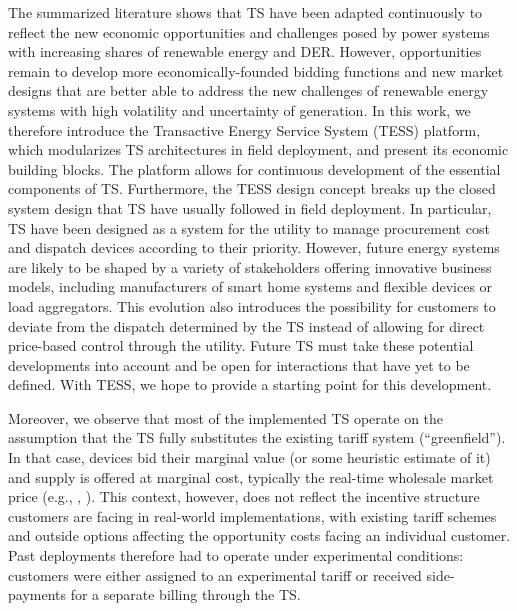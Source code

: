 The summarized literature shows that TS have been adapted continuously to reflect the new economic opportunities and challenges posed by power systems with increasing shares of renewable energy and DER.
However, opportunities remain to develop more economically-founded bidding functions and new market designs that are better able to address the new challenges of renewable energy systems with high volatility and uncertainty of generation.
In this work, we therefore introduce the Transactive Energy Service System (TESS) platform, which modularizes TS architectures in field deployment, and present its economic building blocks. 
The platform allows for continuous development of the essential components of TS.
Furthermore, the TESS design concept breaks up the closed system design that TS have usually followed in field deployment. In particular, TS have been designed as a system for the utility to manage procurement cost and dispatch devices according to their priority. However, future energy systems are likely to be shaped by a variety of stakeholders offering innovative business models, including manufacturers of smart home systems and flexible devices or load aggregators. This evolution also introduces the possibility for customers to deviate from the dispatch determined by the TS instead of allowing for direct price-based control through the utility. 
Future TS must take these potential developments into account and be open for interactions that have yet to be defined. With TESS, we hope to provide a starting point for this development.

Moreover, we observe that most of the implemented TS operate on the assumption that the TS fully substitutes the existing tariff system (``greenfield''). 
In that case, devices bid their marginal value (or some heuristic estimate of it) and supply is offered at marginal cost, typically the real-time wholesale market price (e.g., \citet{PNNL2006}, \citet{katipamula_transactive_2017}). This context, however, does not reflect the incentive structure customers are facing in real-world implementations, with existing tariff schemes and outside options affecting the opportunity costs facing an individual customer.  
Past deployments therefore had to operate under experimental conditions: customers were either assigned to an experimental tariff or received side-payments for a separate billing through the TS. 

